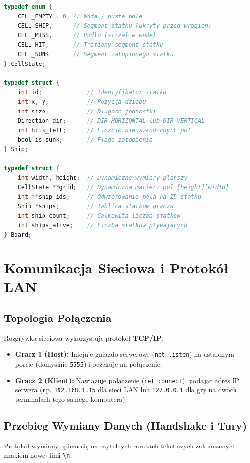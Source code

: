 \documentclass[11pt,a4paper]{article}
\begin{document}
\begin{lstlisting}[language=C, caption={Podstawowe struktury silnika gry (game.h)}]
typedef enum {
    CELL_EMPTY = 0, // Woda / puste pole
    CELL_SHIP,      // Segment statku (ukryty przed wrogiem)
    CELL_MISS,      // Pudlo (strzal w wode)
    CELL_HIT,       // Trafiony segment statku
    CELL_SUNK       // Segment zatopionego statku
} CellState;

typedef struct {
    int id;             // Identyfikator statku
    int x, y;           // Pozycja dziobu
    int size;           // Dlugosc jednostki
    Direction dir;      // DIR_HORIZONTAL lub DIR_VERTICAL
    int hits_left;      // Licznik nieuszkodzonych pol
    bool is_sunk;       // Flaga zatopienia
} Ship;

typedef struct {
    int width, height;  // Dynamiczne wymiary planszy
    CellState **grid;   // Dynamiczna macierz pol [height][width]
    int **ship_ids;     // Odwzorowanie pola na ID statku
    Ship *ships;        // Tablica statkow gracza
    int ship_count;     // Calkowita liczba statkow
    int ships_alive;    // Liczba statkow plywajacych
} Board;
\end{lstlisting}

\section{Komunikacja Sieciowa i Protokół LAN}
\subsection{Topologia Połączenia}
Rozgrywka sieciowa wykorzystuje protokół \textbf{TCP/IP}. 
\begin{itemize}[noitemsep]
    \item \textbf{Gracz 1 (Host):} Inicjuje gniazdo serwerowe (\texttt{net\_listen}) na ustalonym porcie (domyślnie \texttt{5555}) i oczekuje na połączenie.
    \item \textbf{Gracz 2 (Klient):} Nawiązuje połączenie (\texttt{net\_connect}), podając adres IP serwera (np. \texttt{192.168.1.15} dla sieci LAN lub \texttt{127.0.0.1} dla gry na dwóch terminalach tego samego komputera).
\end{itemize}

\subsection{Przebieg Wymiany Danych (Handshake i Tury)}
Protokół wymiany opiera się na czytelnych ramkach tekstowych zakończonych znakiem nowej linii \texttt{\textbackslash n}:
\end{document}
